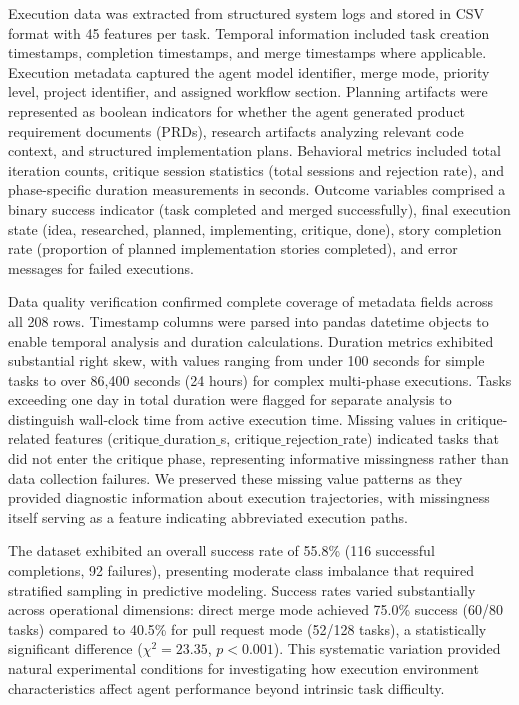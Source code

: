 \documentclass[]{article}
\begin{document}
Execution data was extracted from structured system logs and stored in CSV format with 45 features per task. Temporal information included task creation timestamps, completion timestamps, and merge timestamps where applicable. Execution metadata captured the agent model identifier, merge mode, priority level, project identifier, and assigned workflow section. Planning artifacts were represented as boolean indicators for whether the agent generated product requirement documents (PRDs), research artifacts analyzing relevant code context, and structured implementation plans. Behavioral metrics included total iteration counts, critique session statistics (total sessions and rejection rate), and phase-specific duration measurements in seconds. Outcome variables comprised a binary success indicator (task completed and merged successfully), final execution state (idea, researched, planned, implementing, critique, done), story completion rate (proportion of planned implementation stories completed), and error messages for failed executions.

Data quality verification confirmed complete coverage of metadata fields across all 208 rows. Timestamp columns were parsed into pandas datetime objects to enable temporal analysis and duration calculations. Duration metrics exhibited substantial right skew, with values ranging from under 100 seconds for simple tasks to over 86,400 seconds (24 hours) for complex multi-phase executions. Tasks exceeding one day in total duration were flagged for separate analysis to distinguish wall-clock time from active execution time. Missing values in critique-related features (critique\ensuremath{\_}duration\ensuremath{\_}s, critique\ensuremath{\_}rejection\ensuremath{\_}rate) indicated tasks that did not enter the critique phase, representing informative missingness rather than data collection failures. We preserved these missing value patterns as they provided diagnostic information about execution trajectories, with missingness itself serving as a feature indicating abbreviated execution paths.

The dataset exhibited an overall success rate of 55.8\% (116 successful completions, 92 failures), presenting moderate class imbalance that required stratified sampling in predictive modeling. Success rates varied substantially across operational dimensions: direct merge mode achieved 75.0\% success (60/80 tasks) compared to 40.5\% for pull request mode (52/128 tasks), a statistically significant difference ($\chi^2 = 23.35$, $p < 0.001$). This systematic variation provided natural experimental conditions for investigating how execution environment characteristics affect agent performance beyond intrinsic task difficulty.
\end{document}
